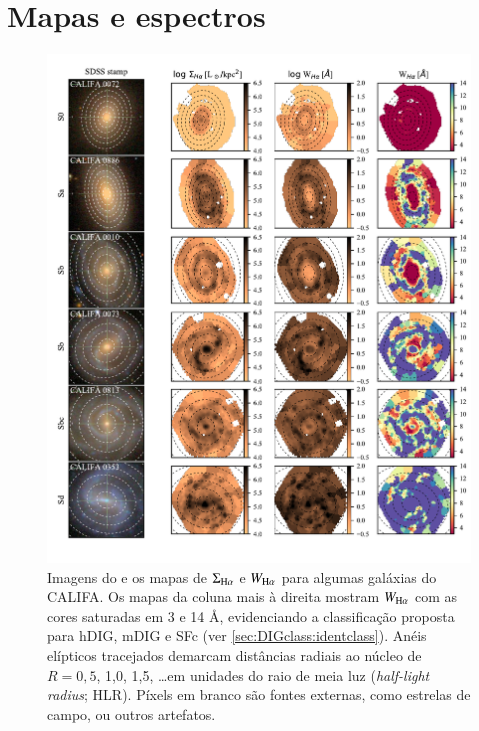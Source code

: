 \section{Mapas e espectros}
\label{sec:sample:maps}
\begin{figure}
\includegraphics[scale=0.9]{figuras/fig_maps_class_faceon_paper.pdf}
 \caption[Imagem \SDSS e mapas de $\Sigma_{{\rm H}\alpha}$ e $W_{{\rm H}\alpha}$]
 {Imagens do \SDSS e os mapas de $\Sigma_{\Ha}$ e $W_{\Ha}$ para algumas galáxias do CALIFA. Os mapas da coluna mais à direita mostram $W_{\Ha}$ com as cores saturadas em 3 e 14 \AA, evidenciando a classificação proposta para hDIG, mDIG e SFc (ver \ref{sec:DIGclass:identclass}). Anéis elípticos tracejados demarcam distâncias radiais ao núcleo de $R = 0,5$, 1,0, 1,5, \dots em unidades do raio de meia luz ({\em half-light radius}; HLR). Píxels em branco são fontes externas, como estrelas de campo, ou outros artefatos.}
 \label{fig:ExampleMaps}
\end{figure}

